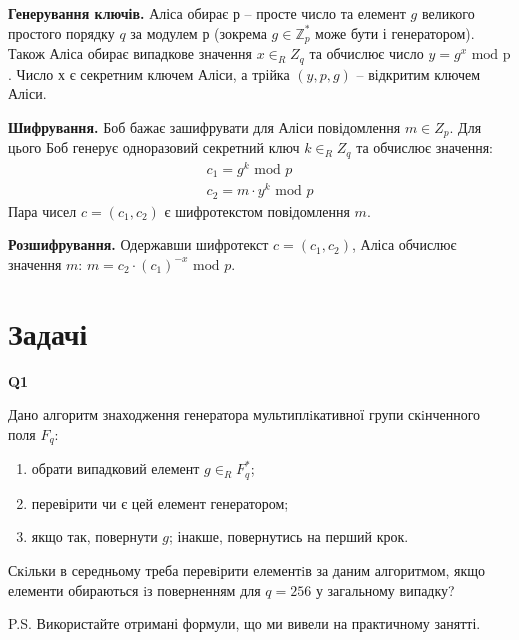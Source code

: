\documentclass{../../test-template}
\begin{document}
\begin{tcolorbox}[breakable, colback=gray!10!white,fonttitle=\bfseries,colframe=purple!50!black,title=Ель-Гамаля]
\textbf{Генерування ключів.} Аліса обирає $р$ -- просте число та елемент $g$ великого простого порядку $q$ за модулем $р$ (зокрема $g\in \mathbb{Z}_p^*$ може бути і генератором). Також Аліса обирає випадкове значення $x\in_R Z_q$ та обчислює число $y=g^x\text{ mod p}$. Число $х$ є секретним ключем Аліси, а трійка $(y,p,g)$ -- відкритим ключем Аліси.

\textbf{Шифрування.} Боб бажає зашифрувати для Аліси повідомлення $m\in Z_p$. Для цього Боб генерує одноразовий секретний ключ $k\in_R Z_q$ та обчислює значення:
\begin{align*}
    c_1=g^k\text{ mod }p \\
    c_2=m\cdot y^k\text{ mod }p
\end{align*}
Пара чисел $c=(c_1,c_2)$ є шифротекстом повідомлення $m$.

\textbf{Розшифрування.} Одержавши шифротекст $c=(c_1,c_2)$, Аліса обчислює значення $m$: $m=c_2\cdot (c_1)^{-x}\text{ mod }p$.  
\end{tcolorbox}


\section*{Задачі}

\begin{tcolorbox}[lowerbox=invisible,colback=white]
    \begin{minipage}{0.1\textwidth}
        \raggedright
        \vspace*{\fill}
            \textbf{Q1}
        \vspace*{\fill}
        \end{minipage}
        \begin{minipage}{0.75\textwidth}
Дано алгоритм знаходження генератора мультиплiкативної групи скiнченного поля $F_q$:
\begin{enumerate}
    \item обрати випадковий елемент $g\in_{R}F_q^*$;
        \item перевірити чи є цей елемент генератором;
        \item якщо так, повернути $g$; інакше, повернутись на перший крок.
\end{enumerate}
Скiльки в середньому треба перевiрити елементiв за даним алгоритмом, якщо елементи обираються iз поверненням для $q=256$ у загальному випадку? 

P.S. Використайте отримані формули, що ми вивели на практичному занятті.
    \end{minipage}
\end{tcolorbox}
\end{document}
